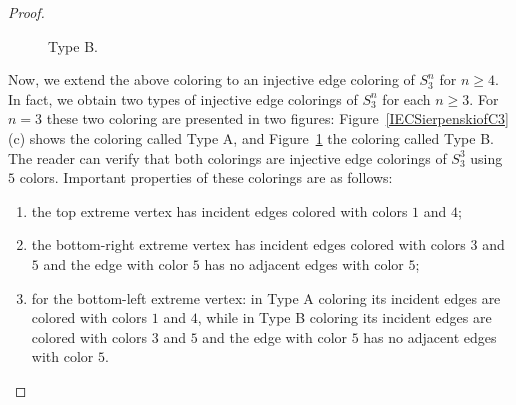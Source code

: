 \documentclass{article}
\begin{document}
\begin{proof}
\begin{figure}[h]
        
    \caption{Type B.}
    \label{fig:S3typeB}
\end{figure}

Now, we extend the above coloring to an injective edge coloring of $S_3^n$ for $n\geq 4$.
In fact, we obtain two types of injective edge colorings of $S_3^n$ for each $n\ge 3$. 
For $n=3$ these two coloring are presented in two figures: Figure~\ref{IECSierpenskiofC3}(c) shows the coloring called Type A, and Figure~\ref{fig:S3typeB} the coloring called Type B. The reader can verify that both colorings are injective edge colorings of $S_3^3$ using $5$ colors. Important properties of these colorings are as follows:
\begin{enumerate}[label=\roman*.,noitemsep]
\item the top extreme vertex has incident edges colored with colors $1$ and $4$;
\item the bottom-right extreme vertex has incident edges colored with colors $3$ and $5$ and the edge with color $5$ has no adjacent edges with color $5$; 
\item for the bottom-left extreme vertex: in Type A coloring its incident edges are colored with colors $1$ and $4$, while in Type B coloring its incident edges are colored with colors $3$ and $5$ and the edge with color $5$ has no adjacent edges with color $5$. 
\end{enumerate}




\end{proof}
\end{document}

